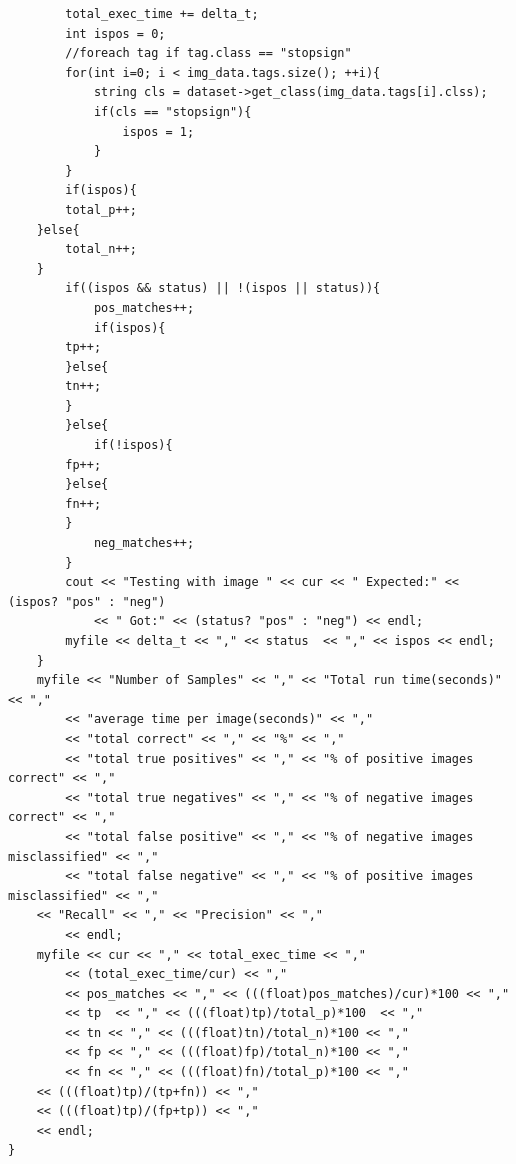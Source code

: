 \documentclass[letterpaper,10pt,titlepage]{article}
\begin{document}
\begin{lstlisting}
        total_exec_time += delta_t;
        int ispos = 0;
        //foreach tag if tag.class == "stopsign"
        for(int i=0; i < img_data.tags.size(); ++i){
            string cls = dataset->get_class(img_data.tags[i].clss);
            if(cls == "stopsign"){
                ispos = 1;
            }
        }
        if(ispos){
	    total_p++;
	}else{
	    total_n++;
	}
        if((ispos && status) || !(ispos || status)){
            pos_matches++;
            if(ispos){
		tp++;
	    }else{
		tn++;
	    }
        }else{
            if(!ispos){
		fp++;
	    }else{
		fn++;
	    }
            neg_matches++;
        }
        cout << "Testing with image " << cur << " Expected:" << (ispos? "pos" : "neg")
            << " Got:" << (status? "pos" : "neg") << endl;
        myfile << delta_t << "," << status  << "," << ispos << endl;
    }
    myfile << "Number of Samples" << "," << "Total run time(seconds)" << "," 
        << "average time per image(seconds)" << "," 
        << "total correct" << "," << "%" << ","
        << "total true positives" << "," << "% of positive images correct" << ","
        << "total true negatives" << "," << "% of negative images correct" << ","
        << "total false positive" << "," << "% of negative images misclassified" << "," 
        << "total false negative" << "," << "% of positive images misclassified" << ","
	<< "Recall" << "," << "Precision" << ","
        << endl;
    myfile << cur << "," << total_exec_time << "," 
        << (total_exec_time/cur) << "," 
        << pos_matches << "," << (((float)pos_matches)/cur)*100 << ","
        << tp  << "," << (((float)tp)/total_p)*100  << ","
        << tn << "," << (((float)tn)/total_n)*100 << ","
        << fp << "," << (((float)fp)/total_n)*100 << "," 
        << fn << "," << (((float)fn)/total_p)*100 << ","
	<< (((float)tp)/(tp+fn)) << ","
	<< (((float)tp)/(fp+tp)) << ","
	<< endl; 
}
\end{lstlisting}
\end{document}
